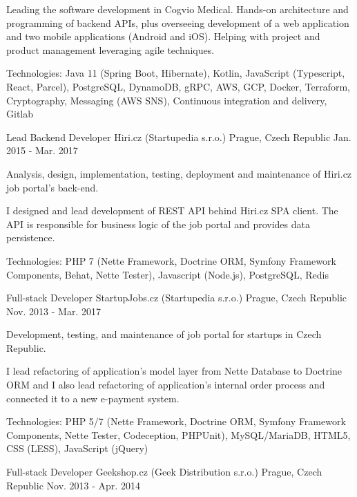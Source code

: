 \begin{cventries}
{\begin{cvitems}
      \item {Leading the software development in Cogvio Medical. Hands-on architecture and programming of backend APIs, plus overseeing development of a web application and two mobile applications (Android and iOS).
       Helping with project and product management leveraging agile techniques.}
      \item {Technologies: Java 11 (Spring Boot, Hibernate), Kotlin, JavaScript (Typescript, React, Parcel), PostgreSQL, DynamoDB, gRPC, AWS, GCP, Docker, Terraform, Cryptography, Messaging (AWS SNS), Continuous integration and delivery, Gitlab}
    \end{cvitems}
  }
  \cventry
    {Lead Backend Developer}
    {Hiri.cz (Startupedia s.r.o.)}
    {Prague, Czech Republic}
    {Jan. 2015 - Mar. 2017}
    {
      \begin{cvitems}
        \item {Analysis, design, implementation, testing, deployment and maintenance of Hiri.cz job portal's back-end.}
        \item {I designed and lead development of REST API behind Hiri.cz SPA client. The API is responsible for business logic of the job portal and provides data persistence.}
        \item {Technologies: PHP 7 (Nette Framework, Doctrine ORM, Symfony Framework Components, Behat, Nette Tester), Javascript (Node.js), PostgreSQL, Redis}
      \end{cvitems}
    }
  \cventry
    {Full-stack Developer}
    {StartupJobs.cz (Startupedia s.r.o.)}
    {Prague, Czech Republic}
    {Nov. 2013 - Mar. 2017}
    {
      \begin{cvitems}
        \item {Development, testing, and maintenance of job portal for startups in Czech Republic.}
        \item {I lead refactoring of application's model layer from Nette Database to Doctrine ORM and I also lead refactoring of application's internal order process and connected it to a new e-payment system.}
        \item {Technologies: PHP 5/7 (Nette Framework, Doctrine ORM, Symfony Framework Components, Nette Tester, Codeception, PHPUnit), MySQL/MariaDB, HTML5, CSS (LESS), JavaScript (jQuery)}
      \end{cvitems}
    }
  \cventry
    {Full-stack Developer}
    {Geekshop.cz (Geek Distribution s.r.o.)}
    {Prague, Czech Republic}
    {Nov. 2013 - Apr. 2014}
    {
      \begin{cvitems}

\end{cvitems}}
\end{cventries}
